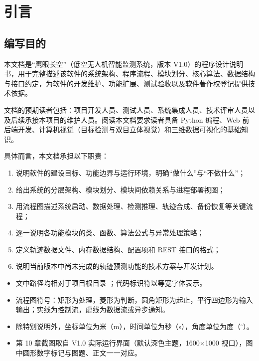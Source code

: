 \section{引言}

\subsection{编写目的}

本文档是“鹰眼长空”（低空无人机智能监测系统，版本 V1.0）的程序设计说明书，用于完整描述该软件的系统架构、程序流程、模块划分、核心算法、数据结构与接口约定，为软件的开发维护、功能扩展、测试验收以及软件著作权登记提供技术依据。

文档的预期读者包括：项目开发人员、测试人员、系统集成人员、技术评审人员以及后续承接本项目的维护人员。阅读本文档要求读者具备 Python 编程、Web 前后端开发、计算机视觉（目标检测与双目立体视觉）和三维数据可视化的基础知识。

具体而言，本文档承担以下职责：
\begin{enumerate}
  \item 说明软件的建设目标、功能边界与运行环境，明确“做什么”与“不做什么”；
  \item 给出系统的分层架构、模块划分、模块间依赖关系与进程部署视图；
  \item 用流程图描述系统启动、数据处理、检测推理、轨迹合成、备份恢复等关键流程；
  \item 逐一说明各功能模块的类、函数、算法公式与异常处理策略；
  \item 定义轨迹数据文件、内存数据结构、配置项和 REST 接口的格式；
  \item 说明当前版本中尚未完成的轨迹预测功能的技术方案与开发计划。
\end{enumerate}

\begin{notebox}[阅读约定]
\begin{itemize}
  \item 文中路径均相对于项目根目录 ；代码标识符以等宽字体表示。
  \item 流程图符号：矩形为处理，菱形为判断，圆角矩形为起止，平行四边形为输入输出；实线为控制流，虚线为数据流或异步通知。
  \item 除特别说明外，坐标单位为米（m），时间单位为秒（s），角度单位为度（$^{\circ}$）。
  \item 第 10 章截图取自 V1.0 实际运行界面（默认深色主题，1600$\times$1000 视口），图中圆形数字标记与图题、正文一一对应。
\end{itemize}
\end{notebox}


